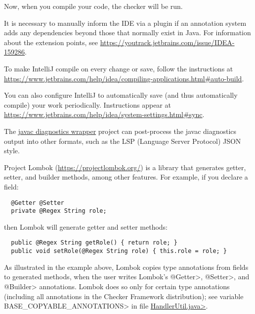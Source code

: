 Now, when you compile your code, the checker will be run.

It is necessary to manually inform the IDE via a plugin if an annotation
system adds any dependencies beyond those that normally exist in Java.
For information about the extension points, see
\url{https://youtrack.jetbrains.com/issue/IDEA-159286}.



To make IntelliJ compile on every change or save,
follow the instructions at
\url{https://www.jetbrains.com/help/idea/compiling-applications.html#auto-build}.

You can also configure IntelliJ to automatically save (and thus
automatically compile) your work periodically. Instructions appear at
\url{https://www.jetbrains.com/help/idea/system-settings.html#sync}.


The \href{https://github.com/eisopux/javac-diagnostics-wrapper}{javac
diagnostics wrapper} project can post-process the javac
diagnostics output into other formats, such as
the LSP (Language Server Protocol) JSON style.



Project Lombok (\url{https://projectlombok.org/}) is a library that
generates getter, setter, and builder methods, among other features.
For example, if you declare
a field:

\begin{Verbatim}
  @Getter @Setter
  private @Regex String role;
\end{Verbatim}

\noindent
then Lombok will generate getter and setter methods:

\begin{Verbatim}
  public @Regex String getRole() { return role; }
  public void setRole(@Regex String role) { this.role = role; }
\end{Verbatim}



As illustrated in the example above, Lombok copies type annotations from fields
to generated methods, when the user writes Lombok's \<@Getter>, \<@Setter>,
and \<@Builder> annotations.  Lombok does so only for certain type
annotations (including all annotations in the Checker Framework
distribution); see variable \<BASE\_COPYABLE\_ANNOTATIONS> in file
\href{https://github.com/projectlombok/lombok/blob/master/src/core/lombok/core/handlers/HandlerUtil.java}{\<HandlerUtil.java>}.

